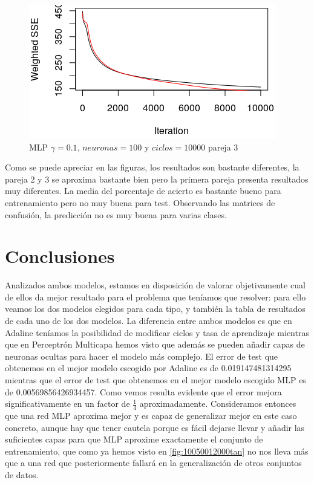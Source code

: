 \documentclass[11pt,spanish,listoffigures,listoftables]{workluis}
\begin{document}
\begin{figure}[H]
\centering
\includegraphics[scale=5]{011003}
\caption{MLP $\gamma = 0.1$, $neuronas = 100$ y $ciclos = 10000$ pareja 3}
\end{figure} 

\par Como se puede apreciar en las figuras, los resultados son bastante diferentes, la pareja 2 y 3 se aproxima bastante bien pero la primera pareja presenta resultados muy diferentes. La media del porcentaje de acierto es bastante bueno para entrenamiento pero no muy buena para test. Observando las matrices de confusión, la predicción no es muy buena para varias clases.



\chapter{Conclusiones}

\par Analizados ambos modelos, estamos en disposición de valorar objetivamente cual de ellos da mejor resultado para el problema que teníamos que resolver: para ello veamos los dos modelos elegidos para cada tipo, y también la tabla de resultados de cada uno de los dos modelos. La diferencia entre ambos modelos es que en Adaline teníamos la posibilidad de modificar ciclos y tasa de aprendizaje mientras que en Perceptrón Multicapa hemos visto que además se pueden añadir capas de neuronas ocultas para hacer el modelo más complejo. El error de test que obtenemos en el mejor modelo escogido por Adaline es de 0.019147481314295 mientras que el error de test que obtenemos en el mejor modelo escogido MLP es de 0.00569856426934457. Como vemos resulta evidente que el error mejora significativamente en un factor de $\frac{1}{4}$ aproximadamente. Consideramos entonces que una red MLP aproxima mejor y es capaz de generalizar mejor en este caso concreto, aunque hay que tener cautela porque es fácil dejarse llevar y añadir las suficientes capas para que MLP aproxime exactamente el conjunto de entrenamiento, que como ya hemos visto en \ref{fig:10050012000tan} no nos lleva más que a una red que posteriormente fallará en la generalización de otros conjuntos de datos.
\end{document}
